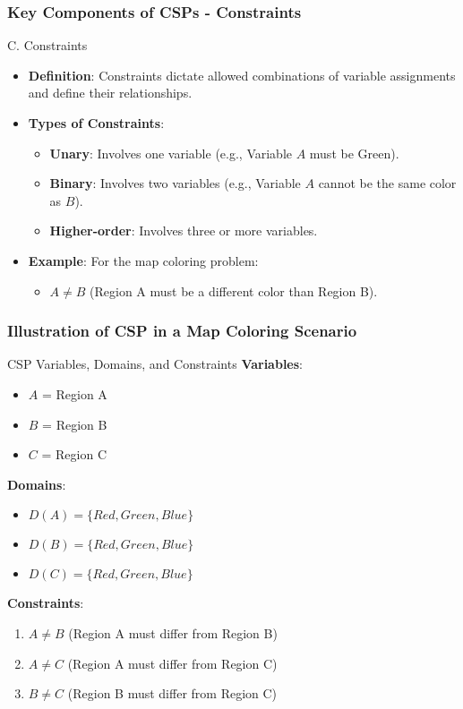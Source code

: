 \documentclass[aspectratio=169]{beamer}
\begin{document}
\begin{frame}[fragile]
    \frametitle{Key Components of CSPs - Constraints}
    \begin{block}{C. Constraints}
        \begin{itemize}
            \item \textbf{Definition}: Constraints dictate allowed combinations of variable assignments and define their relationships.
            \item \textbf{Types of Constraints}:
                \begin{itemize}
                    \item \textbf{Unary}: Involves one variable (e.g., Variable $A$ must be Green).
                    \item \textbf{Binary}: Involves two variables (e.g., Variable $A$ cannot be the same color as $B$).
                    \item \textbf{Higher-order}: Involves three or more variables.
                \end{itemize}
            \item \textbf{Example}: For the map coloring problem:
                \begin{itemize}
                    \item $A \neq B$ (Region A must be a different color than Region B).
                \end{itemize}
        \end{itemize}
    \end{block}
\end{frame}

\begin{frame}[fragile]
    \frametitle{Illustration of CSP in a Map Coloring Scenario}
    \begin{block}{CSP Variables, Domains, and Constraints}
        \textbf{Variables}:
        \begin{itemize}
            \item $A$ = Region A
            \item $B$ = Region B
            \item $C$ = Region C
        \end{itemize}

        \textbf{Domains}:
        \begin{itemize}
            \item $D(A) = \{Red, Green, Blue\}$
            \item $D(B) = \{Red, Green, Blue\}$
            \item $D(C) = \{Red, Green, Blue\}$
        \end{itemize}

        \textbf{Constraints}:
        \begin{enumerate}
            \item $A \neq B$ (Region A must differ from Region B)
            \item $A \neq C$ (Region A must differ from Region C)
            \item $B \neq C$ (Region B must differ from Region C)
        \end{enumerate}
    \end{block}
\end{frame}
\end{document}
